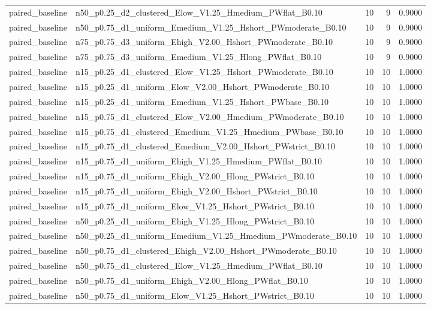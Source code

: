 \begin{tabular}{llrrr}
paired_baseline & n50_p0.25_d2_clustered_Elow_V1.25_Hmedium_PWflat_B0.10 & 10 & 9 & 0.9000 \\
paired_baseline & n50_p0.75_d1_uniform_Emedium_V1.25_Hshort_PWmoderate_B0.10 & 10 & 9 & 0.9000 \\
paired_baseline & n75_p0.75_d3_uniform_Ehigh_V2.00_Hshort_PWmoderate_B0.10 & 10 & 9 & 0.9000 \\
paired_baseline & n75_p0.75_d3_uniform_Emedium_V1.25_Hlong_PWflat_B0.10 & 10 & 9 & 0.9000 \\
paired_baseline & n15_p0.25_d1_clustered_Elow_V1.25_Hshort_PWmoderate_B0.10 & 10 & 10 & 1.0000 \\
paired_baseline & n15_p0.25_d1_uniform_Elow_V2.00_Hshort_PWmoderate_B0.10 & 10 & 10 & 1.0000 \\
paired_baseline & n15_p0.25_d1_uniform_Emedium_V1.25_Hshort_PWbase_B0.10 & 10 & 10 & 1.0000 \\
paired_baseline & n15_p0.75_d1_clustered_Elow_V2.00_Hmedium_PWmoderate_B0.10 & 10 & 10 & 1.0000 \\
paired_baseline & n15_p0.75_d1_clustered_Emedium_V1.25_Hmedium_PWbase_B0.10 & 10 & 10 & 1.0000 \\
paired_baseline & n15_p0.75_d1_clustered_Emedium_V2.00_Hshort_PWstrict_B0.10 & 10 & 10 & 1.0000 \\
paired_baseline & n15_p0.75_d1_uniform_Ehigh_V1.25_Hmedium_PWflat_B0.10 & 10 & 10 & 1.0000 \\
paired_baseline & n15_p0.75_d1_uniform_Ehigh_V2.00_Hlong_PWstrict_B0.10 & 10 & 10 & 1.0000 \\
paired_baseline & n15_p0.75_d1_uniform_Ehigh_V2.00_Hshort_PWstrict_B0.10 & 10 & 10 & 1.0000 \\
paired_baseline & n15_p0.75_d1_uniform_Elow_V1.25_Hshort_PWstrict_B0.10 & 10 & 10 & 1.0000 \\
paired_baseline & n50_p0.25_d1_uniform_Ehigh_V1.25_Hlong_PWstrict_B0.10 & 10 & 10 & 1.0000 \\
paired_baseline & n50_p0.25_d1_uniform_Emedium_V1.25_Hmedium_PWmoderate_B0.10 & 10 & 10 & 1.0000 \\
paired_baseline & n50_p0.75_d1_clustered_Ehigh_V2.00_Hshort_PWmoderate_B0.10 & 10 & 10 & 1.0000 \\
paired_baseline & n50_p0.75_d1_clustered_Elow_V1.25_Hmedium_PWflat_B0.10 & 10 & 10 & 1.0000 \\
paired_baseline & n50_p0.75_d1_uniform_Ehigh_V2.00_Hlong_PWflat_B0.10 & 10 & 10 & 1.0000 \\
paired_baseline & n50_p0.75_d1_uniform_Elow_V1.25_Hshort_PWstrict_B0.10 & 10 & 10 & 1.0000 \\

\end{tabular}
